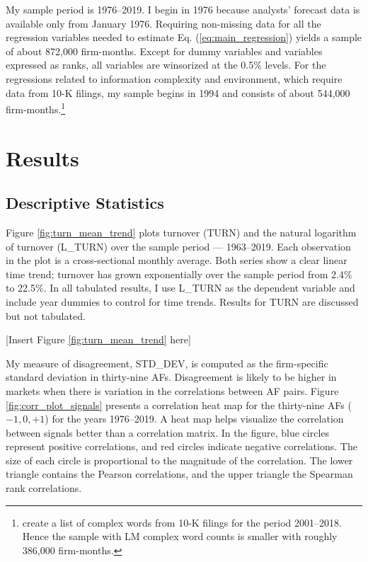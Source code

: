 \documentclass[
  12pt,
  a4paper,
  twoside,
  onecolumn]{article}
\begin{document}
My sample period is 1976--2019. I begin in 1976 because analysts'
forecast data is available only from January 1976. Requiring non-missing
data for all the regression variables needed to estimate Eq.
(\ref{eq:main_regression}) yields a sample of about 872,000 firm-months.
Except for dummy variables and variables expressed as ranks, all
variables are winsorized at the 0.5\% levels. For the regressions
related to information complexity and environment, which require data
from 10-K filings, my sample begins in 1994 and consists of about
544,000 firm-months.\footnote{\cite{lm_2020_firm_complexity} create a
  list of complex words from 10-K filings for the period 2001--2018.
  Hence the sample with LM complex word counts is smaller with roughly
  386,000 firm-months.}

\hypertarget{sec:results}{%
\section{Results}\label{sec:results}}

\hypertarget{descriptive-statistics}{%
\subsection{Descriptive Statistics}\label{descriptive-statistics}}

Figure \ref{fig:turn_mean_trend} plots turnover (TURN) and the natural
logarithm of turnover (L\_TURN) over the sample period --- 1963--2019.
Each observation in the plot is a cross-sectional monthly average. Both
series show a clear linear time trend; turnover has grown exponentially
over the sample period from 2.4\% to 22.5\%. In all tabulated results, I
use L\_TURN as the dependent variable and include year dummies to
control for time trends. Results for TURN are discussed but not
tabulated.

\begin{center} { [Insert Figure \ref{fig:turn_mean_trend} here] } \end{center}

My measure of disagreement, STD\_DEV, is computed as the firm-specific
standard deviation in thirty-nine AFs. Disagreement is likely to be
higher in markets when there is variation in the correlations between AF
pairs. Figure \ref{fig:corr_plot_signals} presents a correlation heat
map for the thirty-nine AFs (\(-1, 0, +1\)) for the years 1976--2019. A
heat map helps visualize the correlation between signals better than a
correlation matrix. In the figure, blue circles represent positive
correlations, and red circles indicate negative correlations. The size
of each circle is proportional to the magnitude of the correlation. The
lower triangle contains the Pearson correlations, and the upper triangle
the Spearman rank correlations.
\end{document}
